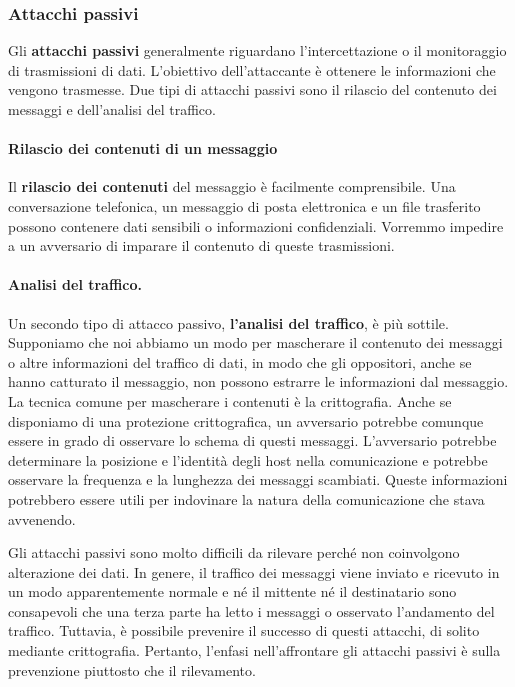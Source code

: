 \subsubsection{Attacchi passivi}
Gli \textbf{attacchi passivi} generalmente riguardano l'intercettazione o il monitoraggio di trasmissioni di dati. L'obiettivo dell'attaccante è ottenere le informazioni che vengono trasmesse. Due tipi di attacchi passivi sono il rilascio del contenuto dei messaggi e dell'analisi del traffico.

\paragraph{Rilascio dei contenuti di un messaggio} Il \textbf{rilascio dei contenuti} del messaggio è facilmente comprensibile. Una conversazione telefonica, un messaggio di posta elettronica e un file trasferito possono contenere dati sensibili o informazioni confidenziali. Vorremmo impedire a un avversario di imparare il contenuto di queste trasmissioni.

\paragraph{Analisi del traffico.} Un secondo tipo di attacco passivo, \textbf{l'analisi del traffico}, è più sottile. Supponiamo che noi abbiamo un modo per mascherare il contenuto dei messaggi o altre informazioni del traffico di dati, in modo che gli oppositori, anche se hanno catturato il messaggio, non possono estrarre le informazioni dal messaggio. La tecnica comune per mascherare i contenuti è la crittografia. Anche se disponiamo di una protezione crittografica, un avversario potrebbe comunque essere in grado di osservare lo schema di questi messaggi. L'avversario potrebbe determinare la posizione e l'identità degli host nella comunicazione e potrebbe osservare la frequenza e la lunghezza dei messaggi scambiati. Queste informazioni potrebbero essere utili per indovinare la natura della comunicazione che stava avvenendo.

Gli attacchi passivi sono molto difficili da rilevare perché non coinvolgono alterazione dei dati. In genere, il traffico dei messaggi viene inviato e ricevuto in un modo apparentemente normale e né il mittente né il destinatario sono consapevoli che una terza parte ha letto i messaggi o osservato l'andamento del traffico. Tuttavia, è possibile prevenire il successo di questi attacchi, di solito mediante crittografia. Pertanto, l'enfasi nell'affrontare gli attacchi passivi è sulla prevenzione piuttosto che il rilevamento.

